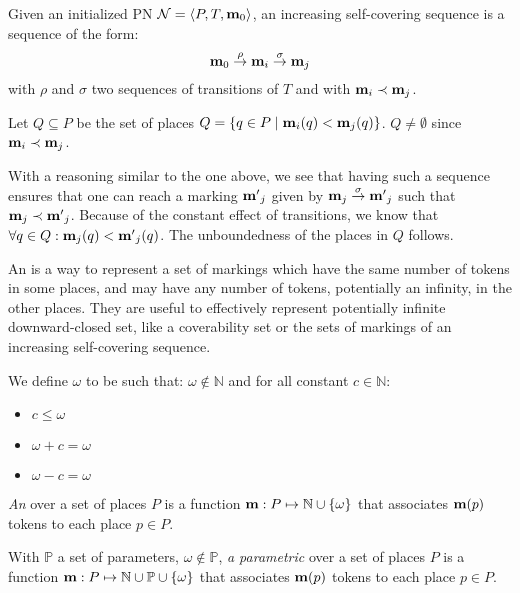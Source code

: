 \begin{defi}
  Given an initialized \ac{PN} $\mathcal{N} = \langle P,T, \mathbf{m}_0\rangle$,
  an increasing self-covering sequence is a sequence of the form:
  \[
    \mathbf{m}_0 \stackrel{\rho}{\to} \mathbf{m}_i \stackrel{\sigma}{\to} \mathbf{m}_j
  \]
  with $\rho$ and $\sigma$ two sequences of transitions of $T$
  and with $\mathbf{m}_i \prec \mathbf{m}_j$.
\end{defi}

Let $Q \subseteq P$ be the set of places $Q = \{q \in P \mid \mathbf{m}_i(q) < \mathbf{m}_j(q)\}$.
$Q \neq \emptyset$ since $\mathbf{m}_i \prec \mathbf{m}_j$.

With a reasoning similar to the one above, we see that having such a sequence ensures that one can reach a marking $\mathbf{m'}_j$ given by $\mathbf{m}_j \stackrel{\sigma}{\to} \mathbf{m'}_j$ such that $\mathbf{m}_j \prec \mathbf{m'}_j$.
Because of the constant effect of transitions, we know that $\forall q \in Q : \mathbf{m}_j(q) < \mathbf{m'}_j(q)$.
The unboundedness of the places in $Q$ follows.

An \omark is a way to represent a set of markings which have the same number of tokens in some places, and may have any number of tokens, potentially an infinity, in the other places.
They are useful to effectively represent potentially infinite downward-closed set, like a coverability set or the sets of markings of an increasing self-covering sequence.

\begin{defi}[\omark]
  We define $\omega$ to be such that:
  $\omega \notin \mathbb{N}$
  and for all constant $c \in \mathbb{N}$:
  \begin{itemize}
    \item $c \leq \omega$
    \item $\omega + c = \omega$
    \item $\omega - c = \omega$
  \end{itemize}

  \emph{An \omark} \marq over a set of places $P$ is a function $\mathbf{m} : P \mapsto \mathbb{N} \cup \{\omega\}$ that associates $\mathbf{m}(p)$ tokens to each place $p \in P$.

  With $\mathbb{P}$ a set of parameters, $\omega \notin \mathbb{P}$,
  \emph{a parametric \omark} \marq over a set of places $P$ is a function $\mathbf{m} : P \mapsto \mathbb{N} \cup \mathbb{P} \cup \{\omega\}$ that associates $\mathbf{m}(p)$ tokens to each place $p \in P$.
\end{defi}

